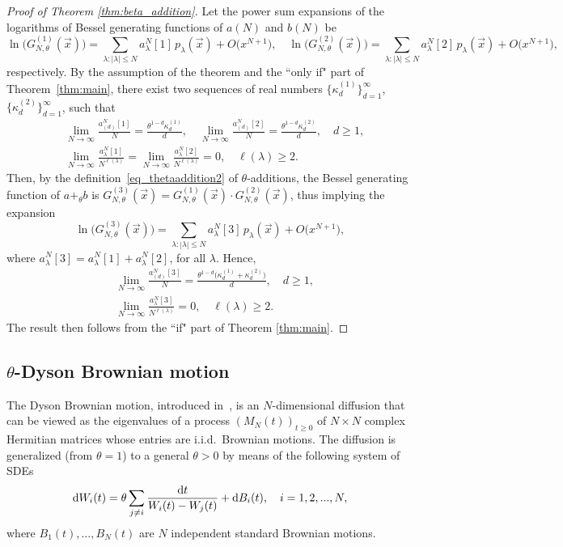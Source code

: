 \documentclass[11pt]{article}
\theoremstyle{plain}
\newcommand{\la}{\lambda}
\renewcommand{\d}{\textrm d}
\newcommand{\vecx}{\vec{x}}
\begin{document}
\begin{proof}[Proof of Theorem \ref{thm:beta_addition}]
    Let the power sum expansions of the logarithms of Bessel generating functions of $a(N)$ and $b(N)$ be
    \[
    \ln\big(G^{(1)}_{N,\theta}(\vecx)\big) = \sum_{\la\colon|\la|\le N}{a^N_\la[1]\,p_\la(\vecx)} + O\big(x^{N+1}\big),\quad \ln\big(G^{(2)}_{N,\theta}(\vecx)\big) = \sum_{\la\colon|\la|\le N}{a^N_\la[2]\,p_\la(\vecx)} + O\big(x^{N+1}\big),
    \]
    respectively.
    By the assumption of the theorem and the ``only if" part of Theorem~\ref{thm:main}, there exist two sequences of real numbers $\big\{\kappa_d^{(1)}\big\}_{d=1}^{\infty}$, $\big\{\kappa_d^{(2)}\big\}_{d=1}^{\infty}$, such that 
    \begin{align*}
        &\lim_{N\to\infty}{\frac{a_{(d)}^N[1]}{N}} = \frac{\theta^{1-d}\kappa_d^{(1)}}{d},\quad \lim_{N\to\infty}{\frac{a_{(d)}^N[2]}{N}} = \frac{\theta^{1-d}\kappa_d^{(2)}}{d},\quad d\ge 1,\\
        &\lim_{N\to\infty}{\frac{a_\la^N[1]}{N^{\ell(\la)}}} = \lim_{N\to\infty}{\frac{a_\la^N[2]}{N^{\ell(\la)}}}=0, \quad \ell(\la)\ge 2.
    \end{align*}
    Then, by the definition~\eqref{eq_thetaaddition2} of $\theta$-additions, the Bessel generating function of $a+_\theta b$ is $G^{(3)}_{N,\theta}(\vecx) = G^{(1)}_{N,\theta}(\vecx)\cdot G^{(2)}_{N,\theta}(\vecx)$, thus implying the expansion
    \[
    \ln\big(G^{(3)}_{N,\theta}(\vecx)\big) = \sum_{\la\colon|\la|\le N}{a^N_\la[3]\,p_\la(\vecx)} + O\big(x^{N+1}\big),
    \]
    where $a^N_\la[3] = a^N_\la[1] + a^N_\la[2]$, for all $\la$. Hence,
    \begin{align*}
        &\lim_{N\to\infty}{\frac{a_{(d)}^N[3]}{N}} = \frac{\theta^{1-d}\big(\kappa_d^{(1)}+\kappa_d^{(2)}\big)}{d}, \quad d\ge 1,\\
        &\lim_{N\to\infty}{\frac{a_\la^N[3]}{N^{\ell(\la)}}}=0, \quad \ell(\la)\ge 2.
    \end{align*}
    The result then follows from the ``if" part of Theorem \ref{thm:main}.
\end{proof}


\subsection{$\theta$-Dyson Brownian motion}


The Dyson Brownian motion, introduced in~\cite{Dy}, is an $N$-dimensional diffusion that can be viewed as the eigenvalues of a process $(M_{N}(t))_{t\ge 0}$ of $N\times N$ complex Hermitian matrices whose entries are i.i.d.~Brownian motions. The diffusion is generalized (from $\theta=1$) to a general $\theta>0$ by means of the following system of SDEs
\begin{equation}\label{eq_dbm}
    \d W_i(t)=\theta\sum_{j\ne i}\frac{\d t}{W_i(t)-W_j(t)} + \d B_i(t),\quad i=1,2,...,N,
\end{equation}
where $B_1(t),\dots,B_N(t)$ are $N$ independent standard Brownian motions.
\end{document}

